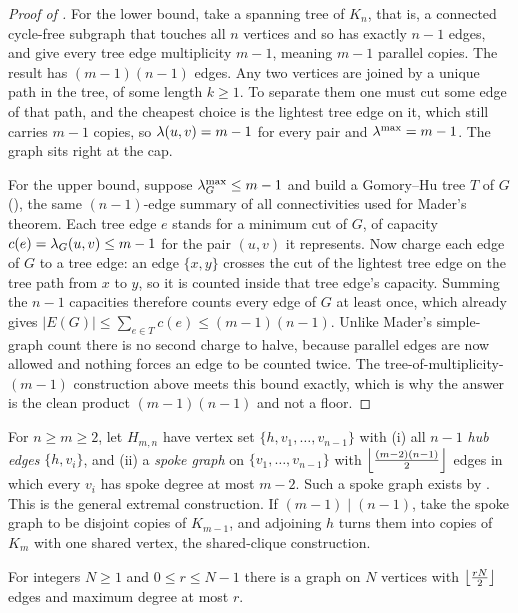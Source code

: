 \begin{proof}[Proof of ]
For the lower bound, take a spanning tree of $K_n$, that is, a connected cycle-free subgraph that touches all $n$ vertices and so has exactly $n-1$ edges, and give every tree edge multiplicity $m - 1$, meaning $m-1$ parallel copies. The result has $(m-1)(n-1)$ edges. Any two vertices are joined by a unique path in the tree, of some length $k \ge 1$. To separate them one must cut some edge of that path, and the cheapest choice is the lightest tree edge on it, which still carries $m-1$ copies, so $\lambda(u, v) = m - 1$ for every pair and $\lambda^{\max} = m - 1$. The graph sits right at the cap.

For the upper bound, suppose $\lambda_G^{\max} \le m - 1$ and build a Gomory--Hu tree $T$ of $G$ (), the same $(n-1)$-edge summary of all connectivities used for Mader's theorem. Each tree edge $e$ stands for a minimum cut of $G$, of capacity $c(e) = \lambda_G(u,v) \le m-1$ for the pair $(u,v)$ it represents. Now charge each edge of $G$ to a tree edge: an edge $\{x,y\}$ crosses the cut of the lightest tree edge on the tree path from $x$ to $y$, so it is counted inside that tree edge's capacity. Summing the $n-1$ capacities therefore counts every edge of $G$ at least once, which already gives $|E(G)| \le \sum_{e \in T} c(e) \le (m-1)(n-1)$. Unlike Mader's simple-graph count there is no second charge to halve, because parallel edges are now allowed and nothing forces an edge to be counted twice. The tree-of-multiplicity-$(m-1)$ construction above meets this bound exactly, which is why the answer is the clean product $(m-1)(n-1)$ and not a floor.
\end{proof}

\begin{construction}\label{const:hub-spokes}
For $n \ge m \ge 2$, let $H_{m,n}$ have vertex set $\{h, v_1, \ldots, v_{n-1}\}$ with
(i) all $n-1$ \emph{hub edges} $\{h, v_i\}$, and
(ii) a \emph{spoke graph} on $\{v_1, \ldots, v_{n-1}\}$ with $\left\lfloor \frac{(m-2)(n-1)}{2} \right\rfloor$ edges in which every $v_i$ has spoke degree at most $m-2$. Such a spoke graph exists by .
This is the general extremal construction. If $(m-1)\mid(n-1)$, take the
spoke graph to be disjoint copies of $K_{m-1}$, and adjoining $h$ turns them into
copies of $K_m$ with one shared vertex, the shared-clique construction.
\label{const:shared-clique}
\end{construction}

\begin{lemma}\label{lem:near-regular}
For integers $N \ge 1$ and $0 \le r \le N-1$ there is a graph on $N$ vertices with $\left\lfloor \frac{rN}{2} \right\rfloor$ edges and maximum degree at most $r$.
\end{lemma}

